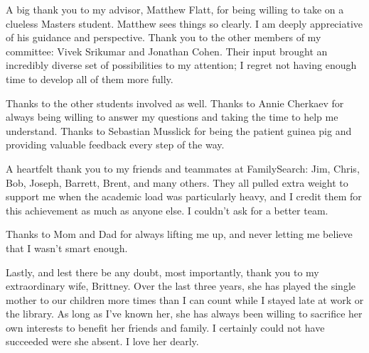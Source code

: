 



A big thank you to my advisor, Matthew Flatt, for being willing to take on a clueless Masters student. Matthew sees things so clearly. I am deeply appreciative of his guidance and perspective. Thank you to the other members of my committee: Vivek Srikumar and Jonathan Cohen. Their input brought an incredibly diverse set of possibilities to my attention; I regret not having enough time to develop all of them more fully.

Thanks to the other students involved as well. Thanks to Annie Cherkaev for always being willing to answer my questions and taking the time to help me understand. Thanks to Sebastian Musslick for being the patient guinea pig and providing valuable feedback every step of the way.

A heartfelt thank you to my friends and teammates at FamilySearch: Jim, Chris, Bob, Joseph, Barrett, Brent, and many others. They all pulled extra weight to support me when the academic load was particularly heavy, and I credit them for this achievement as much as anyone else. I couldn't ask for a better team.

Thanks to Mom and Dad for always lifting me up, and never letting me believe that I wasn't smart enough.

Lastly, and lest there be any doubt, most importantly, thank you to my extraordinary wife, Brittney. Over the last three years, she has played the single mother to our children more times than I can count while I stayed late at work or the library. As long as I've known her, she has always been willing to sacrifice her own interests to benefit her friends and family. I certainly could not have succeeded were she absent. I love her dearly.

